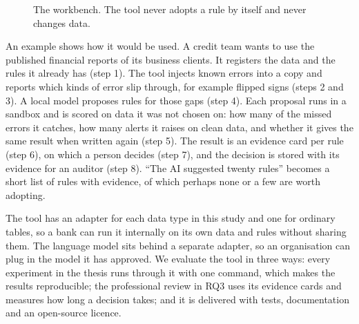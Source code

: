 \documentclass[11pt,a4paper]{article}
\begin{document}
\begin{figure}[htbp]
\centering
{}
\caption{The workbench. The tool never adopts a rule by itself and never changes data.}
\label{fig:tool}
\end{figure}

An example shows how it would be used. A credit team wants to use the published financial reports of its business clients. It registers the data and the rules it already has (step 1). The tool injects known errors into a copy and reports which kinds of error slip through, for example flipped signs (steps 2 and 3). A local model proposes rules for those gaps (step 4). Each proposal runs in a sandbox and is scored on data it was not chosen on: how many of the missed errors it catches, how many alerts it raises on clean data, and whether it gives the same result when written again (step 5). The result is an evidence card per rule (step 6), on which a person decides (step 7), and the decision is stored with its evidence for an auditor (step 8). ``The AI suggested twenty rules'' becomes a short list of rules with evidence, of which perhaps none or a few are worth adopting.

The tool has an adapter for each data type in this study and one for ordinary tables, so a bank can run it internally on its own data and rules without sharing them. The language model sits behind a separate adapter, so an organisation can plug in the model it has approved. We evaluate the tool in three ways: every experiment in the thesis runs through it with one command, which makes the results reproducible; the professional review in RQ3 uses its evidence cards and measures how long a decision takes; and it is delivered with tests, documentation and an open-source licence.
\end{document}
